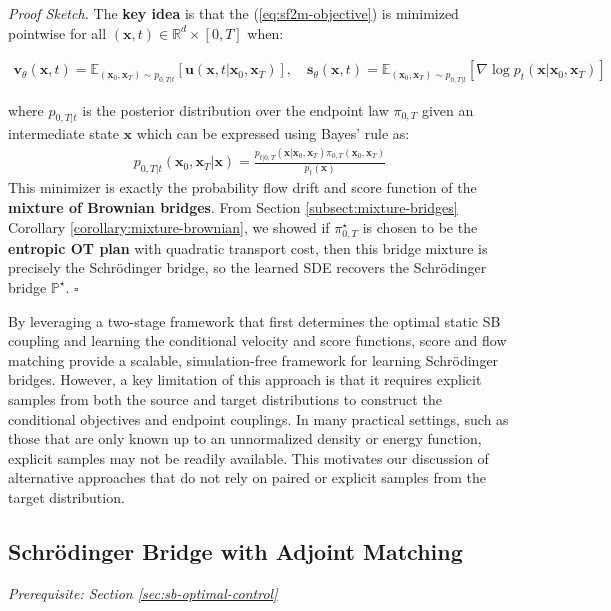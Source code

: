 \documentclass{article}
\begin{document}
\textit{Proof Sketch.} The \textbf{key idea} is that the (\ref{eq:sf2m-objective}) is minimized pointwise for all $(\boldsymbol{x},t)\in \mathbb{R}^d\times [0,T]$ when:
\begin{small}
\begin{align}
    \boldsymbol{v}_\theta(\boldsymbol{x},t)=\mathbb{E}_{(\boldsymbol{x}_0, \boldsymbol{x}_T) \sim p_{0,T|t}}\left[\boldsymbol{u}(\boldsymbol{x},t|\boldsymbol{x}_0,\boldsymbol{x}_T)\right], \quad \boldsymbol{s}_\theta(\boldsymbol{x},t)=\mathbb{E}_{(\boldsymbol{x}_0, \boldsymbol{x}_T) \sim p_{0,T|t}}\left[\nabla \log p_t(\boldsymbol{x}|\boldsymbol{x}_0,\boldsymbol{x}_T)\right]
\end{align}
\end{small}
where $p_{0,T|t}$ is the posterior distribution over the endpoint law $\pi_{0,T}$ given an intermediate state $\boldsymbol{x}$ which can be expressed using Bayes' rule as:
\begin{align}
    p_{0,T|t}(\boldsymbol{x}_0, \boldsymbol{x}_T|\boldsymbol{x})=\frac{p_{t|0,T}(\boldsymbol{x}|\boldsymbol{x}_0, \boldsymbol{x}_T) \pi_{0,T}(\boldsymbol{x}_0,\boldsymbol{x}_T)}{p_t(\boldsymbol{x})}
\end{align}
This minimizer is exactly the probability flow drift and score function of the \textbf{mixture of Brownian bridges}. From Section \ref{subsect:mixture-bridges} Corollary \ref{corollary:mixture-brownian}, we showed if $\pi^\star_{0,T}$ is chosen to be the \textbf{entropic OT plan} with quadratic transport cost, then this bridge mixture is precisely the Schrödinger bridge, so the learned SDE recovers the Schrödinger bridge $\mathbb{P}^\star$. \hfill $\square$

By leveraging a two-stage framework that first determines the optimal static SB coupling and learning the conditional velocity and score functions, score and flow matching provide a scalable, simulation-free framework for learning Schrödinger bridges. However, a key limitation of this approach is that it requires explicit samples from both the source and target distributions to construct the conditional objectives and endpoint couplings. In many practical settings, such as those that are only known up to an unnormalized density or energy function, explicit samples may not be readily available. This motivates our discussion of alternative approaches that do not rely on paired or explicit samples from the target distribution. 


\subsection{Schrödinger Bridge with Adjoint Matching}
\label{subsec:adjoint-matching}
\textit{Prerequisite: Section \ref{sec:sb-optimal-control}}
\end{document}

